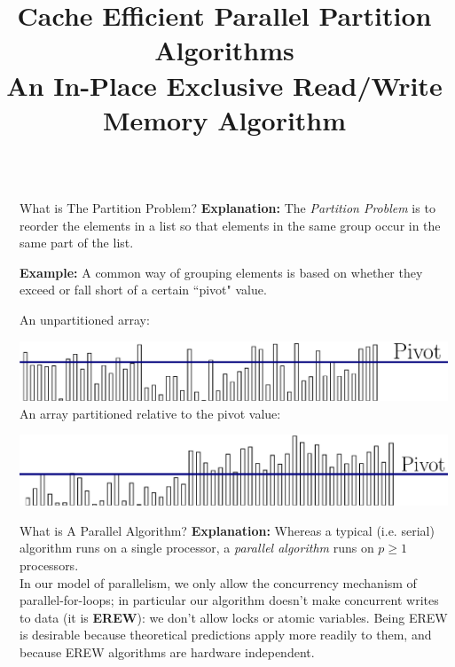 \documentclass[table,serif,mathserif,final]{beamer}
\title{Cache Efficient Parallel Partition Algorithms \\An In-Place Exclusive Read/Write Memory Algorithm}
\theoremstyle{remark}
\begin{document}
\begin{frame}{}
\begin{columns}[t]
\begin{column}{0.02\linewidth}
\end{column}

\begin{column}{0.21\linewidth}

\begin{block}{\Huge What is The Partition Problem?}
  \justifying
  \Huge
  \textbf{Explanation:} The \emph{Partition Problem} is to reorder the elements in a list so that elements in the same group occur in the same part of the list.

  \textbf{Example:} A common way of grouping elements is based on whether they exceed or fall short of a certain ``pivot" value.

  {\color{blue} An unpartitioned array:}

  \includegraphics[width=\linewidth]{imgs/partitionDefn/partitionDefn1Ann.eps}
  {\color{blue} An array partitioned relative to the pivot value:}

  \includegraphics[width=\linewidth]{imgs/partitionDefn/partitionDefn2Ann.eps}
\end{block}
\vspace{0.5cm}

\begin{block}{\Huge What is A Parallel Algorithm?}
  \justifying
  \Huge
  \textbf{Explanation:} Whereas a typical (i.e. serial) algorithm runs on a
  single processor, a \emph{parallel algorithm} runs on $p \geq 1$ processors.\\
  In our model of parallelism, we only allow the concurrency mechanism of
  parallel-for-loops; in particular our algorithm doesn't make concurrent
  writes to data (it is \textbf{EREW}): we don't allow locks or atomic variables. Being
  EREW is desirable because theoretical predictions apply more readily to them,
  and because EREW algorithms are hardware independent. %


\end{block}
\end{column}
\end{columns}
\end{frame}
\end{document}

